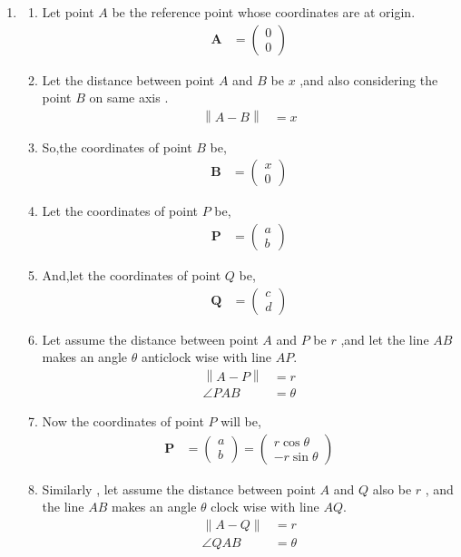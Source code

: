 \documentclass[11pt, a4paper]{article}
\newcommand{\myvec}[1]{\ensuremath{\begin{pmatrix}#1\end{pmatrix}}}
\let\vec\mathbf
\providecommand{\norm}[1]{\left\lVert#1\right\rVert}
\begin{document}
\begin{enumerate}
\item
\begin{enumerate}

\item Let point $A$ be the reference point whose coordinates are at origin. 
\begin{align}
\vec{A} &= \myvec{0 \\ 0}
\end{align}

\item Let the distance between point $A$ and $B$ be $x$ ,and also considering the point $B$ on same axis .
\begin{align}
	\norm{A-B} &= x 
\end{align}

\item So,the coordinates of point $B$ be,
\begin{align}
\vec{B} &= \myvec{x \\ 0}
\end{align}

\item Let the coordinates of point $P$ be,
\begin{align}
\vec{P} &= \myvec{ a \\ b} 
\end{align}

\item And,let the coordinates of point $Q$ be,
\begin{align}
\vec{Q} &= \myvec{ c \\ d} 
\end{align}

\item Let assume the distance between point $A$ and $P$ be $r$ ,and let the line $AB$ makes an angle $ \theta $ anticlock wise with line $AP$.
\begin{align}
	\norm{A-P} &= r \\
\angle PAB &= \theta
\end{align}

\item Now the coordinates of point $P$ will be,
\begin{align}
\vec{P} &= \myvec{ a \\ b } = \myvec{r \cos \theta \\ -r \sin \theta} 
\end{align}

\item Similarly , let assume the distance between point $A$ and $Q$ also be $r$ , and the line $AB$ makes an angle $\theta$ clock wise with line $AQ$.
\begin{align}
	\norm{A-Q} &= r \\
\angle QAB &= \theta 
\end{align}


\end{enumerate}
\end{enumerate}
\end{document}
